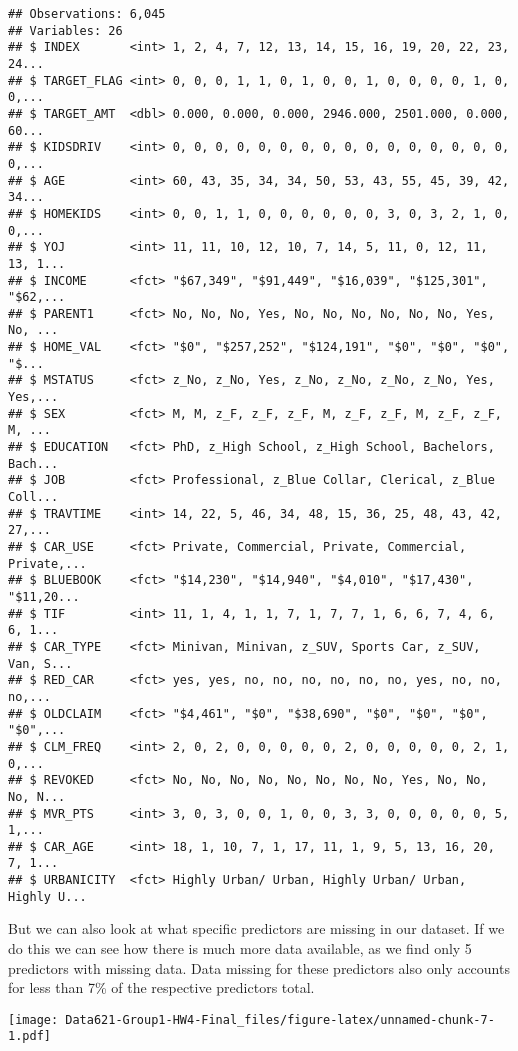 \documentclass[]{article}
\begin{document}
\begin{verbatim}
## Observations: 6,045
## Variables: 26
## $ INDEX       <int> 1, 2, 4, 7, 12, 13, 14, 15, 16, 19, 20, 22, 23, 24...
## $ TARGET_FLAG <int> 0, 0, 0, 1, 1, 0, 1, 0, 0, 1, 0, 0, 0, 0, 1, 0, 0,...
## $ TARGET_AMT  <dbl> 0.000, 0.000, 0.000, 2946.000, 2501.000, 0.000, 60...
## $ KIDSDRIV    <int> 0, 0, 0, 0, 0, 0, 0, 0, 0, 0, 0, 0, 0, 0, 0, 0, 0,...
## $ AGE         <int> 60, 43, 35, 34, 34, 50, 53, 43, 55, 45, 39, 42, 34...
## $ HOMEKIDS    <int> 0, 0, 1, 1, 0, 0, 0, 0, 0, 0, 3, 0, 3, 2, 1, 0, 0,...
## $ YOJ         <int> 11, 11, 10, 12, 10, 7, 14, 5, 11, 0, 12, 11, 13, 1...
## $ INCOME      <fct> "$67,349", "$91,449", "$16,039", "$125,301", "$62,...
## $ PARENT1     <fct> No, No, No, Yes, No, No, No, No, No, No, Yes, No, ...
## $ HOME_VAL    <fct> "$0", "$257,252", "$124,191", "$0", "$0", "$0", "$...
## $ MSTATUS     <fct> z_No, z_No, Yes, z_No, z_No, z_No, z_No, Yes, Yes,...
## $ SEX         <fct> M, M, z_F, z_F, z_F, M, z_F, z_F, M, z_F, z_F, M, ...
## $ EDUCATION   <fct> PhD, z_High School, z_High School, Bachelors, Bach...
## $ JOB         <fct> Professional, z_Blue Collar, Clerical, z_Blue Coll...
## $ TRAVTIME    <int> 14, 22, 5, 46, 34, 48, 15, 36, 25, 48, 43, 42, 27,...
## $ CAR_USE     <fct> Private, Commercial, Private, Commercial, Private,...
## $ BLUEBOOK    <fct> "$14,230", "$14,940", "$4,010", "$17,430", "$11,20...
## $ TIF         <int> 11, 1, 4, 1, 1, 7, 1, 7, 7, 1, 6, 6, 7, 4, 6, 6, 1...
## $ CAR_TYPE    <fct> Minivan, Minivan, z_SUV, Sports Car, z_SUV, Van, S...
## $ RED_CAR     <fct> yes, yes, no, no, no, no, no, no, yes, no, no, no,...
## $ OLDCLAIM    <fct> "$4,461", "$0", "$38,690", "$0", "$0", "$0", "$0",...
## $ CLM_FREQ    <int> 2, 0, 2, 0, 0, 0, 0, 0, 2, 0, 0, 0, 0, 0, 2, 1, 0,...
## $ REVOKED     <fct> No, No, No, No, No, No, No, No, Yes, No, No, No, N...
## $ MVR_PTS     <int> 3, 0, 3, 0, 0, 1, 0, 0, 3, 3, 0, 0, 0, 0, 0, 5, 1,...
## $ CAR_AGE     <int> 18, 1, 10, 7, 1, 17, 11, 1, 9, 5, 13, 16, 20, 7, 1...
## $ URBANICITY  <fct> Highly Urban/ Urban, Highly Urban/ Urban, Highly U...
\end{verbatim}

But we can also look at what specific predictors are missing in our
dataset. If we do this we can see how there is much more data available,
as we find only 5 predictors with missing data. Data missing for these
predictors also only accounts for less than 7\% of the respective
predictors total.

\texttt{[image: Data621-Group1-HW4-Final\_files/figure-latex/unnamed-chunk-7-1.pdf]}
\end{document}
